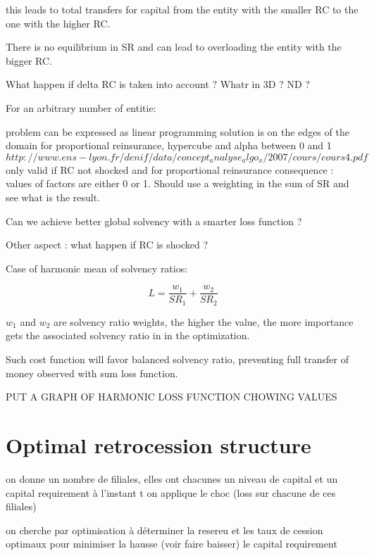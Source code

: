 this leads to total transfers for capital from the entity with the smaller RC to the one with the higher RC.

There is no equilibrium in SR and can lead to overloading the entity with the bigger RC.

What happen if delta RC is taken into account ?
Whatr in 3D ? ND ?

For an arbitrary number of entitie:

problem can be expressed as linear programming
solution is on the edges of the domain
for proportional reinsurance, hypercube and alpha between 0 and 1
$http://www.ens-lyon.fr/denif/data/concept_analyse_algo_x/2007/cours/cours4.pdf$
only valid if RC not shocked and for proportional reinsurance
consequence : values of factors are either 0 or 1.
Should use a weighting in the sum of SR and see what is the result.

Can we achieve better global solvency with a smarter loss function ? 

Other aspect : what happen if RC is shocked ?



Case of harmonic mean of solvency ratios:

\begin{equation}
    L = \frac{w_1}{SR_1} + \frac{w_2}{SR_2}
\end{equation}

$w_1$ and $w_2$ are solvency ratio weights, the higher the value, the more importance gets the associated solvency ratio in in the optimization.

Such cost function will favor balanced solvency ratio, preventing full transfer of money observed with sum loss function.

PUT A GRAPH OF HARMONIC LOSS FUNCTION CHOWING VALUES





\section{Optimal retrocession structure}

on donne un nombre de filiales, elles ont chacunes un niveau de capital et un capital requirement à l'instant t
on applique le choc (loss sur chacune de ces filiales) 

on cherche par optimisation à déterminer la resereu et les taux de cession optimaux pour minimiser la hausse (voir faire baisser) le capital requirement

